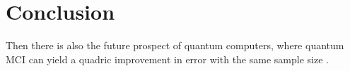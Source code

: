 \section{Conclusion}
Then there is also the future prospect of quantum
computers, where quantum MCI can yield a quadric improvement in error with
the same sample size \parencite{doi:10.1098/rspa.2015.0301}. 